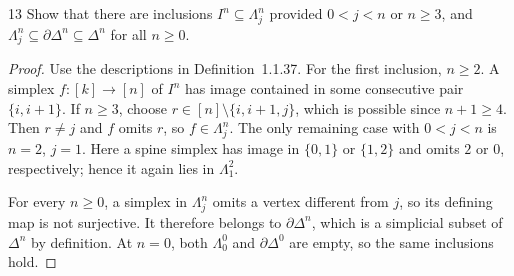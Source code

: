 \begin{exercise}{13}
Show that there are inclusions $I^n\subseteq\Lambda^n_j$ provided
$0<j<n$ or $n\ge3$, and $\Lambda^n_j\subseteq\partial\Delta^n
\subseteq\Delta^n$ for all $n\ge0$.

\begin{proof}
Use the descriptions in Definition~1.1.37. For the first inclusion,
$n\ge2$. A simplex
$f\colon[k]\to[n]$ of $I^n$ has image contained in some consecutive
pair $\{i,i+1\}$. If $n\ge3$, choose
$r\in[n]\setminus\{i,i+1,j\}$, which is possible since $n+1\ge4$.
Then $r\ne j$ and $f$ omits $r$, so $f\in\Lambda^n_j$.
The only remaining case with $0<j<n$ is $n=2$, $j=1$.
Here a spine simplex has image in $\{0,1\}$ or $\{1,2\}$ and omits
$2$ or $0$, respectively; hence it again lies in $\Lambda^2_1$.

For every $n\ge0$, a simplex in $\Lambda^n_j$ omits a vertex
different from $j$, so its defining map is not surjective. It
therefore belongs to $\partial\Delta^n$, which is a simplicial subset
of $\Delta^n$ by definition. At $n=0$, both $\Lambda^0_0$ and
$\partial\Delta^0$ are empty, so the same inclusions hold.
\end{proof}
\end{exercise}
